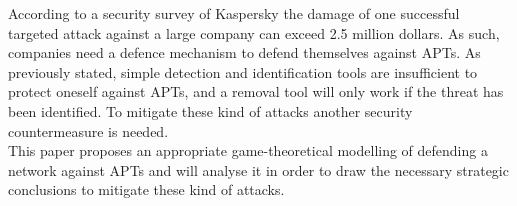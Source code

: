  
According to a security survey of Kaspersky \cite{SurveyKaspersky}  the damage of one successful targeted attack against a large company can exceed 2.5 million dollars. As such, companies need a defence mechanism to defend themselves against APTs. As previously stated, simple detection and identification tools are insufficient to protect oneself against APTs, and a removal tool will only work if the threat has been identified. To mitigate these kind of attacks another security countermeasure is needed. \\
This paper proposes an appropriate game-theoretical modelling of defending a network against APTs and will analyse it in order to draw the necessary strategic conclusions to mitigate these kind of attacks.


